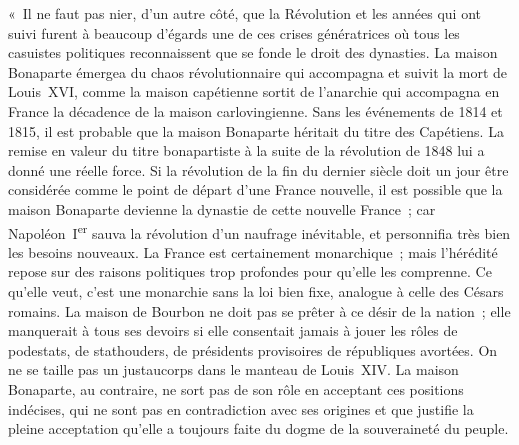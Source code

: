\documentclass[french,twoside]{book} %
\newenvironment{quoteblock}%
  {\begin{quoting}}
  {\end{quoting}}
\newenvironment{quotebar}{%
    \def\FrameCommand{{\color{rubric!10!}\vrule width 0.5em} \hspace{0.9em}}%
    \def\OuterFrameSep{\itemsep} %
    \MakeFramed {\advance\hsize-\width \FrameRestore}
  }%
  {%
    \endMakeFramed
  }
\renewenvironment{quoteblock}%
  {%
    \savenotes
    \setstretch{0.9}
    \normalfont
    \begin{quotebar}
  }
  {%
    \end{quotebar}
    \spewnotes
  }
\begin{document}
\begin{quoteblock}
 « Il ne faut pas nier, d’un autre côté, que la Révolution et les années qui ont suivi furent à beaucoup d’égards une de ces crises génératrices où tous les casuistes politiques reconnaissent que se fonde le droit des dynasties. La maison Bonaparte émergea du chaos révolutionnaire qui accompagna et suivit la mort de Louis XVI, comme la maison capétienne sortit de l’anarchie qui accompagna en France la décadence de la maison carlovingienne. Sans les événements de 1814 et 1815, il est probable que la maison Bonaparte héritait du titre des Capétiens. La remise en valeur du titre bonapartiste à la suite de la révolution de 1848 lui a donné une réelle force. Si la révolution de la fin du dernier siècle doit un jour être considérée comme le point de départ d’une France nouvelle, il est possible que la maison Bonaparte devienne la dynastie de cette nouvelle France ; car Napoléon I\textsuperscript{er} sauva la révolution d’un naufrage inévitable, et personnifia très bien les besoins nouveaux. La France est certainement monarchique ; mais l’hérédité repose sur des raisons politiques trop profondes pour qu’elle les comprenne. Ce qu’elle veut, c’est une monarchie sans la loi bien fixe, analogue à celle des Césars romains. La maison de Bourbon ne doit pas se prêter à ce désir de la nation ; elle manquerait à tous ses devoirs si elle consentait jamais à jouer les rôles de podestats, de stathouders, de présidents provisoires de républiques avortées. On ne se taille pas un justaucorps dans le manteau de Louis XIV. La maison Bonaparte, au contraire, ne sort pas de son rôle en acceptant ces positions indécises, qui ne sont pas en contradiction avec ses origines et que justifie la pleine acceptation qu’elle a toujours faite du dogme de la souveraineté du peuple.\par

\end{quoteblock}
\end{document}
